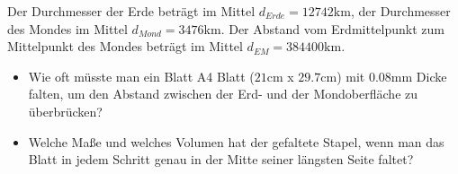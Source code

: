 
Der Durchmesser der Erde beträgt im Mittel $d_{Erde}=12742\text{km}$, der Durchmesser des Mondes im
Mittel $d_{Mond}=3476\text{km}$. Der Abstand vom Erdmittelpunkt zum Mittelpunkt des Mondes beträgt
im Mittel $d_{EM}=384400\text{km}$.

\begin{itemize}
	\item Wie oft müsste man ein Blatt A4 Blatt ($21\text{cm}$ x $29.7\text{cm}$) mit $0.08\text{mm}$ Dicke falten,
		um den Abstand zwischen der Erd- und der Mondoberfläche zu überbrücken?
	\item Welche Maße und welches Volumen hat der gefaltete Stapel, wenn man das Blatt in jedem Schritt genau in der Mitte
		seiner längsten Seite faltet?
\end{itemize}